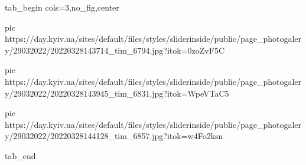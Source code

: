  
 
 
 
 


\ifcmt
  tab_begin cols=3,no_fig,center

     pic https://day.kyiv.ua/sites/default/files/styles/sliderinside/public/page_photogalery/29032022/20220328143714_tim_6794.jpg?itok=0zoZvF5C

		 pic https://day.kyiv.ua/sites/default/files/styles/sliderinside/public/page_photogalery/29032022/20220328143945_tim_6831.jpg?itok=WpeVTaC5

		 pic https://day.kyiv.ua/sites/default/files/styles/sliderinside/public/page_photogalery/29032022/20220328144128_tim_6857.jpg?itok=w4Fo2ksn

  tab_end
\fi
